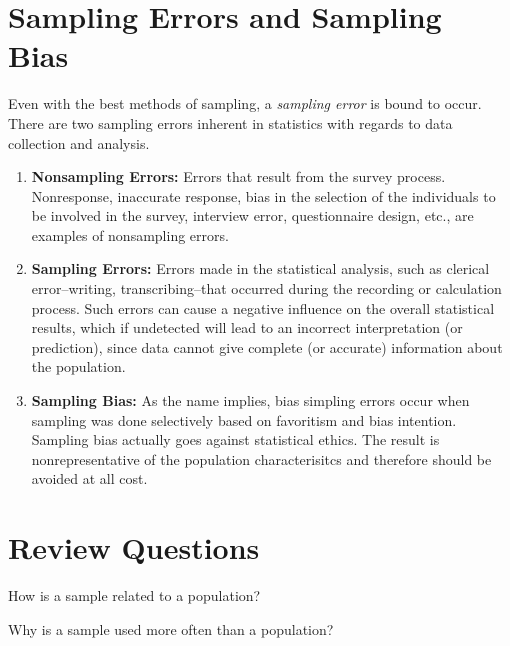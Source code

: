 
\section{Sampling Errors and Sampling Bias}

Even with the best methods of sampling, a {\it{sampling error}} is bound to occur. There are two sampling errors inherent in statistics with regards to data collection and analysis. 
\begin{enumerate}
   \item \textbf{Nonsampling Errors:} Errors that result from the survey process. Nonresponse, inaccurate response, bias in the selection of the individuals to be involved in the survey, interview error, questionnaire design, etc., are examples of nonsampling errors. 

   \item \textbf{Sampling Errors:}  Errors made in the statistical analysis, such as clerical error--writing, transcribing--that occurred during the recording or calculation process. Such errors can cause a negative influence on the overall statistical results, which if undetected will lead to an incorrect interpretation (or prediction), since data cannot give complete (or accurate) information about the population.

   \item \textbf{Sampling Bias:}  As the name implies, bias simpling errors occur when sampling was done selectively based on favoritism and bias intention. Sampling bias actually goes against statistical ethics. The result is nonrepresentative of the population characterisitcs and therefore should be avoided at all cost.  
\end{enumerate}

\section{Review Questions}

\begin{problem}
How is a sample related to a population? 
\end{problem} 

\begin{problem} 
Why is a sample used more often than a population?
\end{problem}

